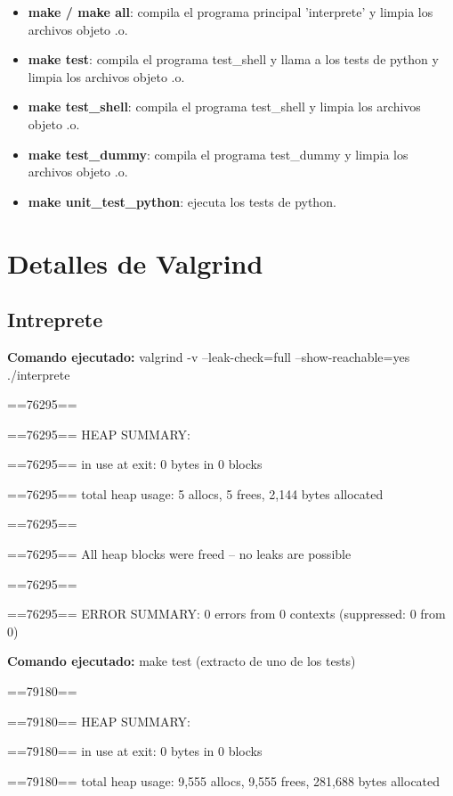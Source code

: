 \documentclass[a4paper, 12pt]{article}
\begin{document}
\begin{itemize}
\item \textbf{make / make all}: compila el programa principal 'interprete' y limpia los archivos objeto .o.
\item \textbf{make test}: compila el programa test\_shell y llama a los tests de python y limpia los archivos objeto .o.
\item \textbf{make test\_shell}: compila el programa test\_shell y limpia los archivos objeto .o.
\item \textbf{make test\_dummy}: compila el programa test\_dummy y limpia los archivos objeto .o.
\item \textbf{make unit\_test\_python}: ejecuta los tests de python.
\end{itemize}

\section{Detalles de Valgrind}

\subsection{Intreprete}
\textbf{Comando ejecutado:} valgrind -v --leak-check=full --show-reachable=yes ./interprete
\newline

==76295== 

==76295== HEAP SUMMARY:

==76295==     in use at exit: 0 bytes in 0 blocks

==76295==   total heap usage: 5 allocs, 5 frees, 2,144 bytes allocated

==76295== 

==76295== All heap blocks were freed -- no leaks are possible

==76295== 

==76295== ERROR SUMMARY: 0 errors from 0 contexts (suppressed: 0 from 0)
\newline
   
\textbf{Comando ejecutado:} make test (extracto de uno de los tests)
\newline

==79180== 

==79180== HEAP SUMMARY:

==79180==     in use at exit: 0 bytes in 0 blocks

==79180==   total heap usage: 9,555 allocs, 9,555 frees, 281,688 bytes allocated
\end{document}
